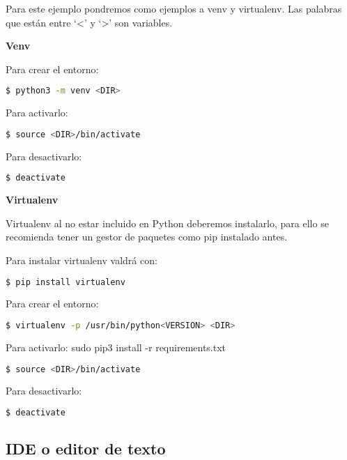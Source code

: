 Para este ejemplo pondremos como ejemplos a venv y virtualenv. Las palabras que están entre `\textless ' y `\textgreater ' son variables. 

\hphantom{something\\}
{\normalsize \textbf{Venv}}

Para crear el entorno: 

\begin{lstlisting}[language=bash]
    $ python3 -m venv <DIR>
\end{lstlisting}


Para activarlo: 

\begin{lstlisting}[language=bash]
    $ source <DIR>/bin/activate
\end{lstlisting}


Para desactivarlo: 


\begin{lstlisting}[language=bash]
    $ deactivate
\end{lstlisting}


\hphantom{something\\}
{\normalsize \textbf{Virtualenv}}

Virtualenv al no estar incluido en Python deberemos instalarlo, para ello se recomienda tener un gestor de paquetes como pip instalado antes.

Para instalar virtualenv valdrá con: 

\begin{lstlisting}[language=bash]
    $ pip install virtualenv
\end{lstlisting}


Para crear el entorno:

\begin{lstlisting}[language=bash]
    $ virtualenv -p /usr/bin/python<VERSION> <DIR>
\end{lstlisting}


	
Para activarlo: sudo pip3 install -r requirements.txt

\begin{lstlisting}[language=bash]
    $ source <DIR>/bin/activate
\end{lstlisting}


Para desactivarlo:

\begin{lstlisting}[language=bash]
    $ deactivate
\end{lstlisting}


\subsection{IDE o editor de texto}

